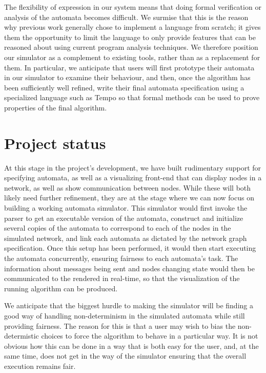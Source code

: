 \documentclass{scrartcl}
\begin{document}
The flexibility of expression in our system means that doing formal verification
or analysis of the automata becomes difficult. We surmise that this is the
reason why previous work generally chose to implement a language from scratch;
it gives them the opportunity to limit the language to only provide features
that can be reasoned about using current program analysis techniques. We
therefore position our simulator as a complement to existing tools, rather than
as a replacement for them. In particular, we anticipate that users will first
prototype their automata in our simulator to examine their behaviour, and then,
once the algorithm has been sufficiently well refined, write their final
automata specification using a specialized language such as Tempo so that
formal methods can be used to prove properties of the final algorithm.

\section{Project status}

At this stage in the project's development, we have built rudimentary support
for specifying automata, as well as a visualizing front-end that can display
nodes in a network, as well as show communication between nodes. While these
will both likely need further refinement, they are at the stage where we can
now focus on building a working automata simulator. This simulator would first
invoke the parser to get an executable version of the automata, construct and
initialize several copies of the automata to correspond to each of the nodes in
the simulated network, and link each automata as dictated by the network graph
specification. Once this setup has been performed, it would then start
executing the automata concurrently, ensuring fairness to each automata's task.
The information about messages being sent and nodes changing state would then
be communicated to the rendered in real-time, so that the visualization of the
running algorithm can be produced.

We anticipate that the biggest hurdle to making the simulator will be finding a
good way of handling non-determinism in the simulated automata while still
providing fairness. The reason for this is that a user may wish to bias the
non-determistic choices to force the algorithm to behave in a particular way.
It is not obvious how this can be done in a way that is both easy for the user,
and, at the same time, does not get in the way of the simulator ensuring that
the overall execution remains fair.
\end{document}
